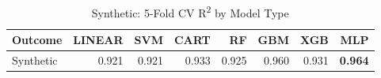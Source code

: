 \begin{table}[ht]
\centering
\caption{Synthetic: 5-Fold CV R\textsuperscript{2} by Model Type}
\begin{tabular}{lrrrrrrr}
\toprule
Outcome & LINEAR & SVM & CART & RF & GBM & XGB & MLP \\
\midrule
Synthetic & 0.921 & 0.921 & 0.933 & 0.925 & 0.960 & 0.931 & \textbf{0.964} \\
\bottomrule
\end{tabular}
\end{table}